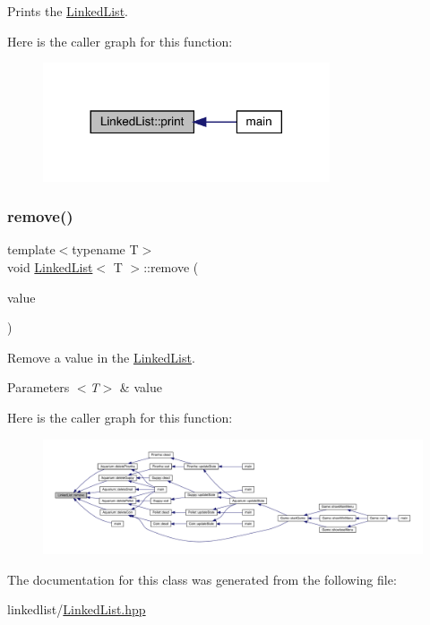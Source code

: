 Prints the \mbox{\hyperlink{class_linked_list}{Linked\+List}}. 

Here is the caller graph for this function\+:\nopagebreak
\begin{figure}[H]
\begin{center}
\leavevmode
\includegraphics[width=240pt]{class_linked_list_a9675767b81fb9f1d8799444e4ee7f43b_icgraph}
\end{center}
\end{figure}
\mbox{\label{class_linked_list_ad9b63a24343b67236dcf119e66066c24}} 
\subsubsection{\texorpdfstring{remove()}{remove()}}
{\footnotesize\ttfamily template$<$typename T$>$ \\
void \mbox{\hyperlink{class_linked_list}{Linked\+List}}$<$ T $>$\+::remove (\begin{DoxyParamCaption}\item[{T}]{value }\end{DoxyParamCaption})\hspace{0.3cm}{\ttfamily [inline]}}



Remove a value in the \mbox{\hyperlink{class_linked_list}{Linked\+List}}. 


\begin{DoxyParams}{Parameters}
{\em $<$\+T$>$} & value \\
\hline
\end{DoxyParams}
Here is the caller graph for this function\+:
\nopagebreak
\begin{figure}[H]
\begin{center}
\leavevmode
\includegraphics[width=350pt]{class_linked_list_ad9b63a24343b67236dcf119e66066c24_icgraph}
\end{center}
\end{figure}


The documentation for this class was generated from the following file\+:\begin{DoxyCompactItemize}
\item 
linkedlist/\mbox{\hyperlink{_linked_list_8hpp}{Linked\+List.\+hpp}}\end{DoxyCompactItemize}
